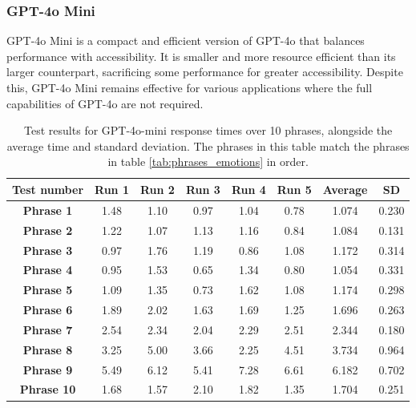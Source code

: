 \subsubsection{GPT-4o Mini}

GPT-4o Mini is a compact and efficient version of GPT-4o that balances performance with accessibility. It is smaller and more resource efficient than its larger counterpart, sacrificing some performance for greater accessibility. Despite this, GPT-4o Mini remains effective for various applications where the full capabilities of GPT-4o are not required.

\begin{table}[h!]
\centering{}
\caption{Test results for GPT-4o-mini response times over 10 phrases, alongside the average time and standard deviation. The phrases in this table match the phrases in table \ref{tab:phrases_emotions} in order.}
\begin{tabular}{|c|c|c|c|c|c|c|c|}
\hline
\textbf{Test number} & \textbf{Run 1} & \textbf{Run 2} & \textbf{Run 3} & \textbf{Run 4} & \textbf{Run 5} & \textbf{Average} & \textbf{SD} \\ \hline
\textbf{Phrase 1}  & 1.48 & 1.10 & 0.97 & 1.04 & 0.78 & 1.074 & 0.230          \\ \hline
\textbf{Phrase 2}  & 1.22 & 1.07 & 1.13 & 1.16 & 0.84 & 1.084 & 0.131          \\ \hline
\textbf{Phrase 3}  & 0.97 & 1.76 & 1.19 & 0.86 & 1.08 & 1.172 & 0.314          \\ \hline
\textbf{Phrase 4}  & 0.95 & 1.53 & 0.65 & 1.34 & 0.80 & 1.054 & 0.331          \\ \hline
\textbf{Phrase 5}  & 1.09 & 1.35 & 0.73 & 1.62 & 1.08 & 1.174 & 0.298          \\ \hline
\textbf{Phrase 6}  & 1.89 & 2.02 & 1.63 & 1.69 & 1.25 & 1.696 & 0.263          \\ \hline
\textbf{Phrase 7}  & 2.54 & 2.34 & 2.04 & 2.29 & 2.51 & 2.344 & 0.180          \\ \hline
\textbf{Phrase 8}  & 3.25 & 5.00 & 3.66 & 2.25 & 4.51 & 3.734 & 0.964          \\ \hline
\textbf{Phrase 9}  & 5.49 & 6.12 & 5.41 & 7.28 & 6.61 & 6.182 & 0.702          \\ \hline
\textbf{Phrase 10} & 1.68 & 1.57 & 2.10 & 1.82 & 1.35 & 1.704 & 0.251          \\ \hline
\end{tabular}
\label{tab:phrase_gpt4o-mini}
\end{table}

